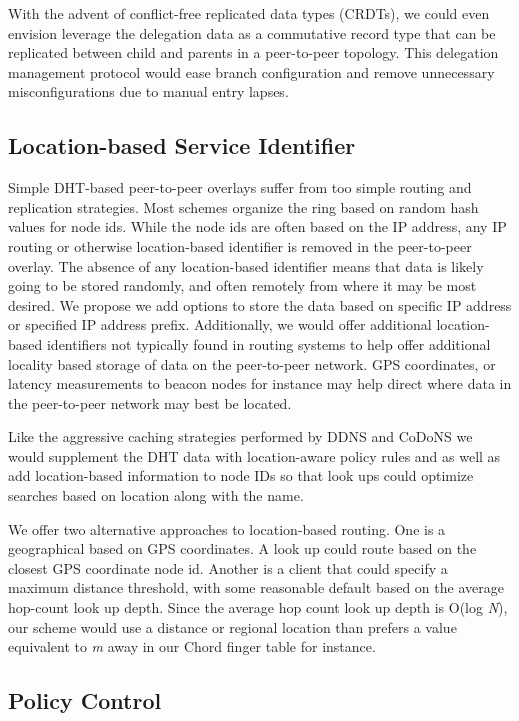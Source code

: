 \documentclass[sigconf]{acmart}
\begin{document}
With the advent of conflict-free replicated data types (CRDTs), we could
even envision leverage the delegation data as a commutative record type
that can be replicated between child and parents in a peer-to-peer
topology.\cite{shapiro_conflict-free_2011}  This delegation management
protocol would ease branch configuration and remove unnecessary
misconfigurations due to manual entry lapses.

\subsection{Location-based Service Identifier}

Simple DHT-based peer-to-peer overlays suffer from too simple routing
and replication strategies.  Most schemes organize the ring based on
random hash values for node ids.  While the node ids are often based on
the IP address, any IP routing or otherwise location-based identifier is
removed in the peer-to-peer overlay.  The absence of any location-based
identifier means that data is likely going to be stored randomly, and
often remotely from where it may be most desired.  We propose we add
options to store the data based on specific IP address or specified IP
address prefix.  Additionally, we would offer additional location-based
identifiers not typically found in routing systems to help offer
additional locality based storage of data on the peer-to-peer network.
GPS coordinates, or latency measurements to beacon nodes for instance
may help direct where data in the peer-to-peer network may best be
located.

Like the aggressive caching strategies performed by DDNS and CoDoNS we
would supplement the DHT data with location-aware policy rules and as
well as add location-based information to node IDs so that look ups
could optimize searches based on location along with the name.

We offer two alternative approaches to location-based routing.  One is a
geographical based on GPS coordinates.  A look up could route based on
the closest GPS coordinate node id.  Another is a client that could
specify a maximum distance threshold, with some reasonable default based
on the average hop-count look up depth.  Since the average hop count
look up depth is O(log \emph{N}), our scheme would use a distance or
regional location than prefers a value equivalent to \emph{m} away in
our Chord finger table for instance.

\subsection{Policy Control}
\end{document}
